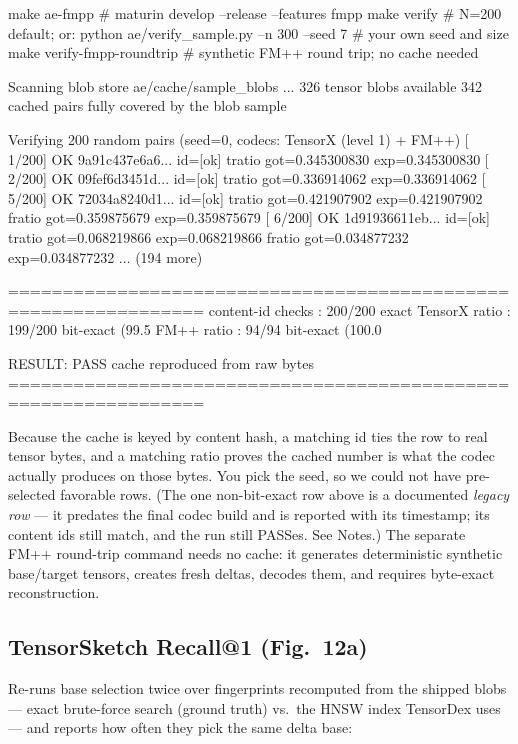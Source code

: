 \documentclass[11pt]{article}
\begin{document}
\begin{shell}
make ae-fmpp             # maturin develop --release --features fmpp
make verify              # N=200 default; or:
python ae/verify_sample.py --n 300 --seed 7     # your own seed and size
make verify-fmpp-roundtrip  # synthetic FM++ round trip; no cache needed
\end{shell}
\begin{term}
Scanning blob store ae/cache/sample_blobs ...
  326 tensor blobs available
  342 cached pairs fully covered by the blob sample

Verifying 200 random pairs (seed=0, codecs: TensorX (level 1) + FM++)
  [  1/200] OK  9a91c437e6a6...  id=[ok]  tratio got=0.345300830 exp=0.345300830
  [  2/200] OK  09fef6d3451d...  id=[ok]  tratio got=0.336914062 exp=0.336914062
  [  5/200] OK  72034a8240d1...  id=[ok]  tratio got=0.421907902 exp=0.421907902
                                          fratio got=0.359875679 exp=0.359875679
  [  6/200] OK  1d91936611eb...  id=[ok]  tratio got=0.068219866 exp=0.068219866
                                          fratio got=0.034877232 exp=0.034877232
  ... (194 more)

================================================================
content-id checks : 200/200 exact
TensorX ratio     : 199/200 bit-exact (99.5%
FM++ ratio        : 94/94 bit-exact (100.0%

RESULT: PASS  cache reproduced from raw bytes
================================================================
\end{term}

Because the cache is keyed by content hash, a matching id ties the row to
real tensor bytes, and a matching ratio proves the cached number is what the
codec actually produces on those bytes. You pick the seed, so we could not
have pre-selected favorable rows. (The one non-bit-exact row above is a
documented \emph{legacy row} --- it predates the final codec build and is
reported with its timestamp; its content ids still match, and the run still
PASSes. See Notes.) The separate FM++ round-trip command needs no cache: it
generates deterministic synthetic base/target tensors, creates fresh deltas,
decodes them, and requires byte-exact reconstruction.

\subsection{TensorSketch Recall@1 (Fig.~12a)}

Re-runs base selection twice over fingerprints recomputed from the shipped
blobs --- exact brute-force search (ground truth) vs.\ the HNSW index
TensorDex uses --- and reports how often they pick the same delta base:
\end{document}

